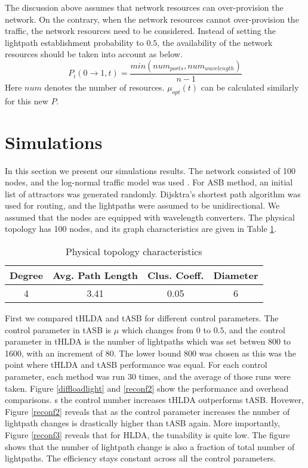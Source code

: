 \documentclass[conference]{IEEEtran}
\begin{document}
The discussion above assumes that network resources can over-provision the network. On the contrary, when the network resources cannot over-provision the traffic, the network resources need to be considered.
Instead of setting the  lightpath establishment probability to $0.5$, the availability of the network resources should be taken into account as below.
 \begin{equation}
P_i(0\rightarrow 1, t)=\frac{min(num_{ports},num_{wavelength})}{n-1} 
\end{equation} 
Here $num$ denotes the number of resources. $\mu_{opt}(t)$ can be calculated similarly for this new $P$. 
 
\section{Simulations} \label{simulations}
In this section we present our simulations results. 
The network consisted of 100 nodes, and the log-normal traffic model was used \cite{Nucci:PSGI05}.
For ASB method, an initial list of attractors was generated randomly. Dijsktra's shortest path algorithm was used for routing, and the lightpaths were assumed to  be unidirectional. We assumed that the nodes are equipped with wavelength converters.
 The physical topology has 100 nodes, and its graph characteristics are given in Table \ref{physicaltab}.
 
 \begin{table}[h]
\caption{Physical topology characteristics}
\centering
\begin{tabular}{cccc} \hline   \label{physicaltab}
   Degree &          Avg. Path Length & Clus. Coeff. &Diameter \\ \hline 
 	4    	&	3.41	& 0.05 					&	6		 \\	
\hline
\end{tabular}
\end{table}





First we compared tHLDA and tASB for different control parameters. 
The control parameter in tASB is $\mu$ which changes from $0$ to $0.5$, and the control parameter in tHLDA is 
the number of lightpaths which was set betwen 800 to 1600, with an increment of 80.  
The lower bound 800 was chosen as this was the point where tHLDA and tASB performance was equal.
For each control parameter, each method was run 30 times, and the average of those runs were taken.
Figure \ref{diffloadlight} and \ref{reconf2} show the performance and overhead comparisons. 
s the control number increases tHLDA outperforms tASB. Hovewer, Figure \ref{reconf2} 	
reveals that as the control parameter increases the number of lightpath changes is drastically higher 
than tASB again. More importantly, Figure \ref{reconf3} reveals that for HLDA, the tunability is quite low.
The figure shows that the number of lightpath change is also a fraction of total number of lightpaths.
The efficiency stays constant across all the control parameters.
\end{document}
